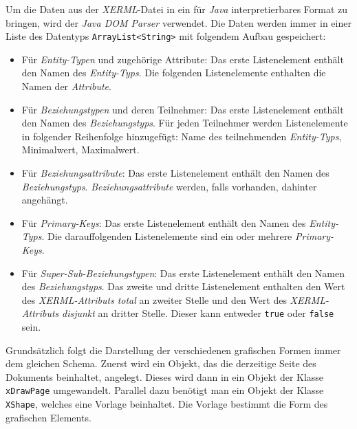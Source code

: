 \noindent
Um die Daten aus der \textit{XERML}-Datei in ein für \textit{Java} interpretierbares Format zu bringen, wird der \textit{Java DOM Parser} verwendet. Die Daten werden immer in einer Liste des Datentyps \verb|ArrayList<String>| mit folgendem Aufbau gespeichert:
\begin{itemize}
	\item Für \textit{Entity-Typen} und zugehörige Attribute: Das erste Listenelement enthält den Namen des \textit{Entity-Typs}. Die folgenden Listenelemente enthalten die Namen der \textit{Attribute}.
	\item Für \textit{Beziehungstypen} und deren Teilnehmer: Das erste Listenelement enthält den Namen des \textit{Beziehungstyps}. Für jeden  Teilnehmer werden Listenelemente in folgender Reihenfolge hinzugefügt: Name des teilnehmenden \textit{Entity-Typs}, Minimalwert, Maximalwert.
	\item Für \textit{Beziehungsattribute}: Das erste Listenelement enthält den Namen des \textit{Beziehungstyps}. \textit{Beziehungsattribute} werden, falls vorhanden, dahinter angehängt.
	\item Für \textit{Primary-Keys}: Das erste Listenelement enthält den Namen des \textit{Entity-Typs}. Die darauffolgenden Listenelemente sind ein oder mehrere \textit{Primary-Keys}.
	\item Für \textit{Super-Sub-Beziehungstypen}: Das erste Listenelement enthält den Namen des \textit{Beziehungstyps}. Das zweite und dritte Listenelement enthalten den Wert des \textit{XERML-Attributs} \textit{total} an zweiter Stelle und den Wert des \textit{XERML-Attributs} \textit{disjunkt} an dritter Stelle. Dieser kann entweder \verb|true| oder \verb|false| sein. 
\end{itemize}


\noindent
{}
\hon{}

\noindent
Grundsätzlich folgt die Darstellung der verschiedenen grafischen Formen immer dem gleichen Schema. Zuerst wird ein Objekt, das die derzeitige Seite des Dokuments beinhaltet, angelegt. Dieses wird dann in ein Objekt der Klasse \verb|xDrawPage| umgewandelt. Parallel dazu benötigt man ein Objekt der Klasse \verb|XShape|, welches eine Vorlage beinhaltet. Die Vorlage bestimmt die Form des grafischen Elements. 


